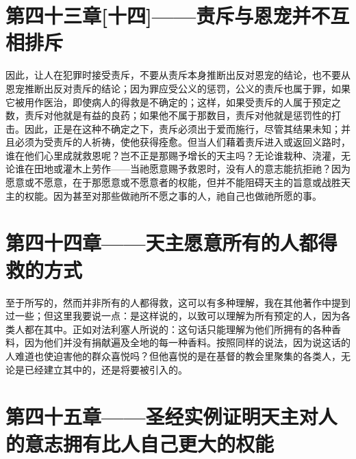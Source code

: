 
\section{第四十三章[十四]——责斥与恩宠并不互相排斥}

因此，让人在犯罪时接受责斥，不要从责斥本身推断出反对恩宠的结论，也不要从恩宠推断出反对责斥的结论；因为罪应受公义的惩罚，公义的责斥也属于罪，如果它被用作医治，即使病人的得救是不确定的；这样，如果受责斥的人属于预定之数，责斥对他就是有益的良药；如果他不属于那数目，责斥对他就是惩罚性的打击。因此，正是在这种不确定之下，责斥必须出于爱而施行，尽管其结果未知；并且必须为受责斥的人祈祷，使他获得痊愈。但当人们藉着责斥进入或返回义路时，谁在他们心里成就救恩呢？岂不正是那赐予增长的天主吗？无论谁栽种、浇灌，无论谁在田地或灌木上劳作——当祂愿意赐予救恩时，没有人的意志能抗拒祂？因为愿意或不愿意，在于那愿意或不愿意者的权能，但并不能阻碍天主的旨意或战胜天主的权能。因为甚至对那些做祂所不愿之事的人，祂自己也做祂所愿的事。\par


\section{第四十四章——天主愿意所有的人都得救的方式}

至于所写的，然而并非所有的人都得救，这可以有多种理解，我在其他著作中提到过一些；但这里我要说一点：是这样说的，以致可以理解为所有预定的人，因为各类人都在其中。正如对法利塞人所说的：这句话只能理解为他们所拥有的各种香料，因为他们并没有捐献遍及全地的每一种香料。按照同样的说法，因为说这话的人难道也使迫害他的群众喜悦吗？但他喜悦的是在基督的教会里聚集的各类人，无论是已经建立其中的，还是将要被引入的。\par


\section{第四十五章——圣经实例证明天主对人的意志拥有比人自己更大的权能}

